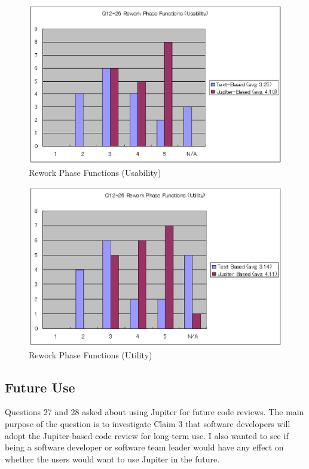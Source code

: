\begin{figure}[htbp]
  \centering
  \includegraphics{images/fig5-15.eps}
  \caption{Rework Phase Functions (Usability)}
  \label{fig5-15}
\end{figure}

\begin{figure}[htbp]
  \centering
  \includegraphics{images/fig5-16.eps}
  \caption{Rework Phase Functions (Utility)}
  \label{fig5-16}
\end{figure}

\subsection{Future Use}
\label{subsec:future-use}

Questions 27 and 28 asked about using Jupiter for future code reviews. The main purpose of the question is to investigate Claim 3 that software developers will adopt the Jupiter-based code review for long-term use. I also wanted to see if being a software developer or software team leader would have any effect on whether the users would want to use Jupiter in the future.

